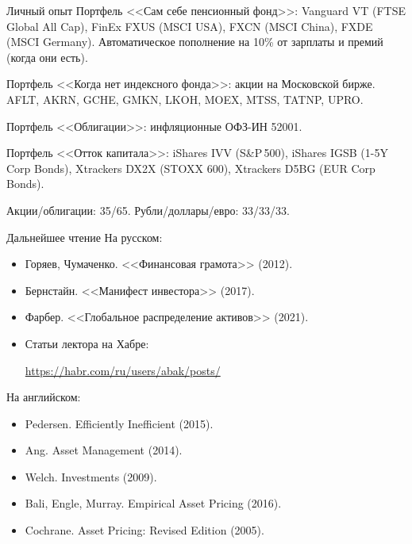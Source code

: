 \documentclass{beamer}
\begin{document}
\begin{frame}{Личный опыт}
\justify
Портфель <<Сам себе пенсионный фонд>>: Vanguard VT (FTSE Global All Cap), FinEx FXUS (MSCI USA), FXCN (MSCI China), FXDE (MSCI Germany). Автоматическое пополнение на 10\% от зарплаты и премий (когда они есть).

\justify
Портфель <<Когда нет индексного фонда>>: акции на Московской бирже. AFLT, AKRN, GCHE, GMKN, LKOH, MOEX, MTSS, TATNP, UPRO.

\justify
Портфель <<Облигации>>: инфляционные ОФЗ-ИН 52001.

\justify
Портфель <<Отток капитала>>: iShares IVV (S\&P\,500), iShares IGSB (1-5Y Corp Bonds), Xtrackers DX2X (STOXX 600), Xtrackers D5BG (EUR Corp Bonds).

\justify
Акции/облигации: 35/65. Рубли/доллары/евро: 33/33/33.
\end{frame}



\begin{frame}{Дальнейшее чтение}
На русском:
\begin{itemize}
\justifying
\item Горяев, Чумаченко. <<Финансовая грамота>> (2012).
\item Бернстайн. <<Манифест инвестора>> (2017).
\item Фарбер. <<Глобальное распределение активов>> (2021).
\item Статьи лектора на Хабре:

\url{https://habr.com/ru/users/abak/posts/}
\end{itemize}
На английском:
\begin{itemize}
\item Pedersen. Efficiently Inefficient (2015).
\item Ang. Asset Management (2014).
\item Welch. Investments (2009).
\item Bali, Engle, Murray. Empirical Asset Pricing (2016).
\item Cochrane. Asset Pricing: Revised Edition (2005).

\end{itemize}
\end{frame}
\end{document}
